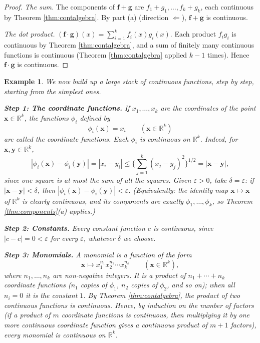 \documentclass{article}
\theoremstyle{mythm}
\newtheorem{example}[theorem]{Example}
\begin{document}
\begin{proof}
\textit{The sum.} The components of $\mathbf{f} + \mathbf{g}$ are $f_1 + g_1, \dots, f_k + g_k$, each continuous by Theorem \ref{thm:contalgebra}. By part (a) (direction $\Leftarrow$), $\mathbf{f} + \mathbf{g}$ is continuous.

\textit{The dot product.} $(\mathbf{f}\cdot\mathbf{g})(x) = \sum_{i=1}^k f_i(x) g_i(x)$. Each product $f_i g_i$ is continuous by Theorem \ref{thm:contalgebra}, and a sum of finitely many continuous functions is continuous (Theorem \ref{thm:contalgebra} applied $k-1$ times). Hence $\mathbf{f}\cdot\mathbf{g}$ is continuous.
\end{proof}

\begin{example}\label{ex:polynomials}
We now build up a large stock of continuous functions, step by step, starting from the simplest ones.

\textbf{Step 1: The coordinate functions.} If $x_1, \dots, x_k$ are the coordinates of the point $\mathbf{x} \in \mathbb{R}^k$, the functions $\phi_i$ defined by
\[
\phi_i(\mathbf{x}) = x_i \qquad (\mathbf{x} \in \mathbb{R}^k)
\]
are called the \textit{coordinate functions}. Each $\phi_i$ is continuous on $\mathbb{R}^k$. Indeed, for $\mathbf{x}, \mathbf{y} \in \mathbb{R}^k$,
\[
|\phi_i(\mathbf{x}) - \phi_i(\mathbf{y})| = |x_i - y_i| \leq \Big\{\sum_{j=1}^k (x_j - y_j)^2\Big\}^{1/2} = |\mathbf{x} - \mathbf{y}|,
\]
since one square is at most the sum of all the squares. Given $\varepsilon > 0$, take $\delta = \varepsilon$: if $|\mathbf{x} - \mathbf{y}| < \delta$, then $|\phi_i(\mathbf{x}) - \phi_i(\mathbf{y})| < \varepsilon$. (Equivalently: the identity map $\mathbf{x} \mapsto \mathbf{x}$ of $\mathbb{R}^k$ is clearly continuous, and its components are exactly $\phi_1, \dots, \phi_k$, so Theorem \ref{thm:components}(a) applies.)

\textbf{Step 2: Constants.} Every constant function $c$ is continuous, since $|c - c| = 0 < \varepsilon$ for every $\varepsilon$, whatever $\delta$ we choose.

\textbf{Step 3: Monomials.} A \textit{monomial} is a function of the form
\[
\mathbf{x} \mapsto x_1^{n_1} x_2^{n_2} \cdots x_k^{n_k} \qquad (\mathbf{x} \in \mathbb{R}^k), \tag{M}
\]
where $n_1, \dots, n_k$ are non-negative integers. It is a product of $n_1 + \cdots + n_k$ coordinate functions ($n_1$ copies of $\phi_1$, $n_2$ copies of $\phi_2$, and so on); when all $n_i = 0$ it is the constant $1$. By Theorem \ref{thm:contalgebra}, the product of two continuous functions is continuous. Hence, by induction on the number of factors (if a product of $m$ coordinate functions is continuous, then multiplying it by one more continuous coordinate function gives a continuous product of $m+1$ factors), every monomial is continuous on $\mathbb{R}^k$.


\end{example}
\end{document}
